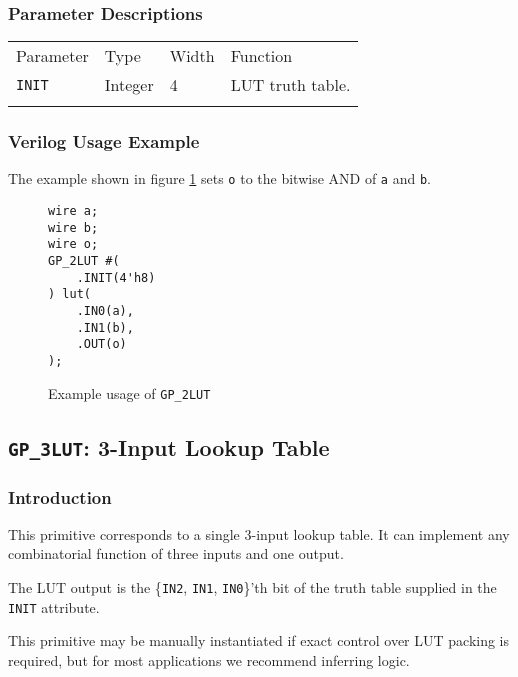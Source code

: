 \documentclass[11pt]{article}
\newcommand{\tokenstyle}[1]{\texttt{#1}}
\newcommand{\wirestyle}[1]{\texttt{#1}}
\newcommand{\whenstyle}[1]{{\fontseries{sb}\selectfont#1}}
\newcommand{\thinhline}{\Xhline{1\arrayrulewidth}}
\newcommand{\thickhline}{\Xhline{2.5\arrayrulewidth}}
\begin{document}
\subsubsection{Parameter Descriptions}

\begin{tabularx}{\textwidth}{lllX}
\thinhline
\whenstyle{Parameter} & \whenstyle{Type} & \whenstyle{Width} & \whenstyle{Function} \\
\thickhline
\tokenstyle{INIT} & Integer & 4 & LUT truth table. \\
\thinhline
\end{tabularx}

\subsubsection{Verilog Usage Example}

The example shown in figure \ref{gp-2LUT-example} sets \wirestyle{o} to the bitwise AND of \wirestyle{a} and \wirestyle{b}.

\begin{figure}[h]
\begin{lstlisting}
wire a;
wire b;
wire o;
GP_2LUT #(
	.INIT(4'h8)
) lut(
	.IN0(a),
	.IN1(b),
	.OUT(o)
);
\end{lstlisting}
\caption{Example usage of \tokenstyle{GP\_2LUT}}
\label{gp-2LUT-example}
\end{figure}


\pagebreak
\subsection{\tokenstyle{GP\_3LUT}: 3-Input Lookup Table}
\label{gp-3lut}

\subsubsection{Introduction}
This primitive corresponds to a single 3-input lookup table. It can implement any combinatorial function of three
inputs and one output.

The LUT output is the \{\tokenstyle{IN2}, \tokenstyle{IN1}, \tokenstyle{IN0}\}'th bit of the truth table supplied in the \tokenstyle{INIT} attribute.

This primitive may be manually instantiated if exact control over LUT packing is required, but for most applications we
recommend inferring logic.
\end{document}
